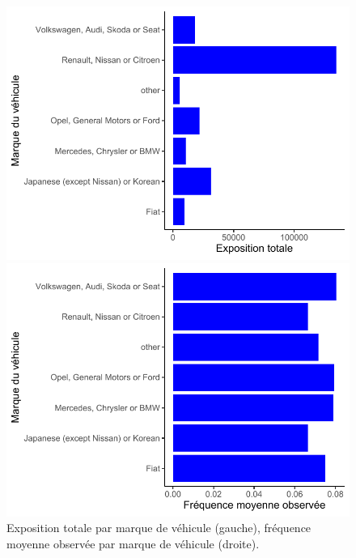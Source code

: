 \begin{figure}
\caption{\label{fig:ExpoTotFreqMoyBrand} Exposition totale par marque de véhicule (gauche), fréquence moyenne observée par marque de véhicule (droite).}
\begin{minipage}{0.4\linewidth}
\includegraphics[scale=0.5]{Graphiques/ExpoTotBrand}
\end{minipage}
\hfill
\begin{minipage}{0.4\linewidth}
\includegraphics[scale=0.5]{Graphiques/FreqMoyBrand}
\end{minipage}
\end{figure}

